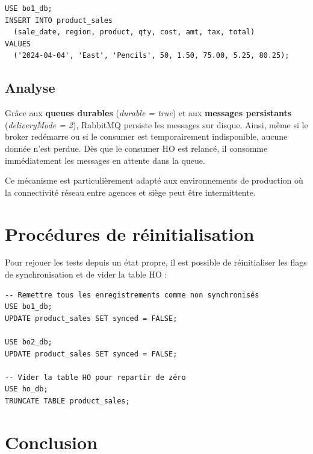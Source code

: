 \documentclass[a4paper,12pt]{article}
\begin{document}
\begin{lstlisting}[style=sql, caption={Insertion d'un enregistrement de test pour le scénario de résilience}]
USE bo1_db;
INSERT INTO product_sales 
  (sale_date, region, product, qty, cost, amt, tax, total)
VALUES 
  ('2024-04-04', 'East', 'Pencils', 50, 1.50, 75.00, 5.25, 80.25);
\end{lstlisting}

\subsection{Analyse}

Grâce aux \textbf{queues durables} (\textit{durable = true}) et aux \textbf{messages persistants} (\textit{deliveryMode = 2}), RabbitMQ persiste les messages sur disque. Ainsi, même si le broker redémarre ou si le consumer est temporairement indisponible, aucune donnée n'est perdue. Dès que le consumer HO est relancé, il consomme immédiatement les messages en attente dans la queue.

Ce mécanisme est particulièrement adapté aux environnements de production où la connectivité réseau entre agences et siège peut être intermittente.

\section{Procédures de réinitialisation}

Pour rejouer les tests depuis un état propre, il est possible de réinitialiser les flags de synchronisation et de vider la table HO :

\begin{lstlisting}[style=sql, caption={Réinitialisation pour nouveaux tests}]
-- Remettre tous les enregistrements comme non synchronisés
USE bo1_db;
UPDATE product_sales SET synced = FALSE;

USE bo2_db;
UPDATE product_sales SET synced = FALSE;

-- Vider la table HO pour repartir de zéro
USE ho_db;
TRUNCATE TABLE product_sales;
\end{lstlisting}

\section{Conclusion}
\end{document}
